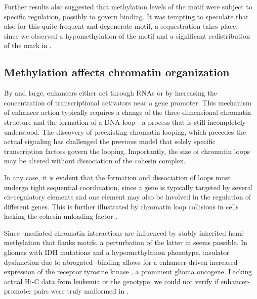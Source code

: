 Further results also suggested that methylation levels of the motif \motifmlltwo were subject to specific regulation, possibly to govern  binding. It was tempting to speculate that also for this quite frequent and degenerate motif, a sequestration takes place, since we observed a hypomethylation of the motif and a significant redistribution of the \hisfourthree mark in \dnmtchip {}. 

\subsection{Methylation affects chromatin organization}  
\label{chap:d:enhancers:mechanism:dnmtchipgeno:methloops}  

By and large, enhancers either act through RNAs or by increasing the concentration of transcriptional activators near a gene promoter. This mechanism of enhancer action typically requires a change of the three-dimensional chromatin structure and the formation of a DNA loop - a process that is still incompletely understood. The discovery of preexisting chromatin looping, which precedes the actual signaling\cite{Jin2013} has challenged the previous model\cite{Arensbergen2014} that solely specific transcription factors govern the looping\cite{Drissen2004,Vakoc2005}. Importantly, the size of chromatin loops may be altered without dissociation of the cohesin complex\cite{Haarhuis2017}.

In any case, it is evident that the formation and dissociation of loops must undergo tight sequential coordination, since a gene is typically targeted by several cis-regulatory elements and one element may also be involved in the regulation of different genes\cite{Hughes2014,Bertolino2016,Javierre2016}. This is further illustrated by chromatin loop collisions in cells lacking the cohesin-unloading factor \cite{Allahyar2018}.

Since -mediated chromatin interactions are influenced by stably inherited hemi-methylation that flanks  motifs\cite{Xu2018b}, a perturbation of the latter in \dnmtchip seems possible. In gliomas with IDH mutations and a hypermethylation phenotype, insulator dysfunction due to abrogated -binding allows for a enhancer-driven increased expression of the receptor tyrosine kinase , a prominent glioma oncogene\cite{Flavahan2016}. Lacking actual Hi-C data from \mllafnine leukemia or the \dnmtchip genotype, we could not verify if enhancer-promoter pairs were truly malformed in \dnmtchip. 

